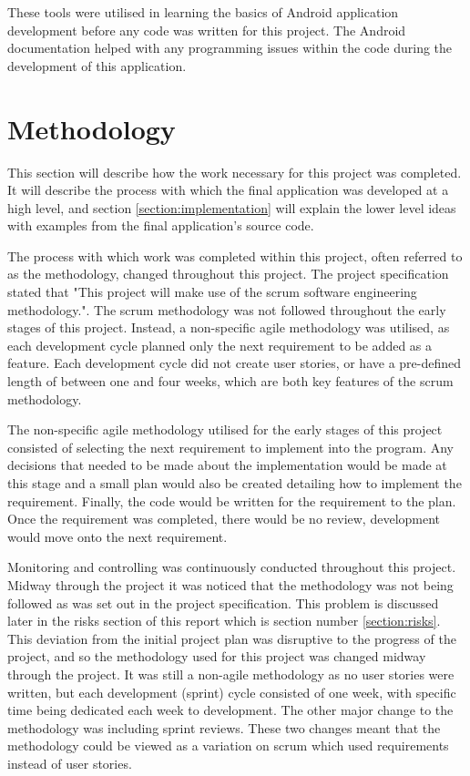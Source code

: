 \documentclass{article}
\begin{document}
These tools were utilised in learning the basics of Android application development before any code was written for this project. The Android documentation helped with any programming issues within the code during the development of this application. 

\section{Methodology}
\label{section:methodology}

This section will describe how the work necessary for this project was completed. It will describe the process with which the final application was developed at a high level, and section \ref{section:implementation} will explain the lower level ideas with examples from the final application's source code. \par

The process with which work was completed within this project, often referred to as the methodology, changed throughout this project. The project specification stated that "This project will make use of the scrum software engineering methodology.". The scrum methodology was not followed throughout the early stages of this project. Instead, a non-specific agile methodology was utilised, as each development cycle planned only the next requirement to be added as a feature. Each development cycle did not create user stories, or have a pre-defined length of between one and four weeks, which are both key features of the scrum methodology. \par

The non-specific agile methodology utilised for the early stages of this project consisted of selecting the next requirement to implement into the program. Any decisions that needed to be made about the implementation would be made at this stage and a small plan would also be created detailing how to implement the requirement. Finally, the code would be written for the requirement to the plan. Once the requirement was completed, there would be no review, development would move onto the next requirement. \par

Monitoring and controlling was continuously conducted throughout this project. Midway through the project it was noticed that the methodology was not being followed as was set out in the project specification. This problem is discussed later in the risks section of this report which is section number \ref{section:risks}. This deviation from the initial project plan was disruptive to the progress of the project, and so the methodology used for this project was changed midway through the project. It was still a non-agile methodology as no user stories were written, but each development (sprint) cycle consisted of one week, with specific time being dedicated each week to development. The other major change to the methodology was including sprint reviews. These two changes meant that the methodology could be viewed as a variation on scrum which used requirements instead of user stories.\par
\end{document}
